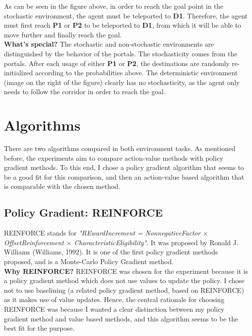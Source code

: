 \documentclass[10pt, letterpaper, twocolumn]{article}
\begin{document}
	As can be seen in the figure above, in order to reach the goal point in the stochastic environment, the agent must be teleported to \textbf{D1}. Therefore, the agent must first reach \textbf{P1} or \textbf{P2} to be teleported to \textbf{D1}, from which it will be able to move further and finally reach the goal.\\
	
	\noindent \textbf{What's special?} The stochastic and non-stochastic environments are distinguished by the behavior of the portals. The stochasticity comes from the portals. After each usage of either \textbf{P1} or \textbf{P2}, the destinations are randomly re-initialized according to the probabilities above. The deterministic environment (image on the right of the figure) clearly has no stochasticity, as the agent only needs to follow the corridor in order to reach the goal.
	
	\section{Algorithms}
	
	\noindent There are two algorithms compared in both environment tasks. As mentioned before, the experiments aim to compare action-value methods with policy gradient methods. To this end, I chose a policy gradient algorithm that seems to be a good fit for this comparison, and then an action-value based algorithm that is comparable with the chosen method.
	
	\subsection{Policy Gradient: REINFORCE}
	\noindent REINFORCE stands for \textit{"REwardIncrement = NonnegativeFactor $\times$ OffsetReinforcement $\times$ CharacteristicEligibility"}. It was proposed by Ronald J. Williams (Williams, 1992). It is one of the first policy gradient methods proposed, and is a Monte-Carlo Policy Gradient method. \\
	
	\noindent \textbf{Why REINFORCE?} REINFORCE was chosen for the experiment because it is a policy gradient method which does not use values to update the policy. I chose not to use baselining (a related policy gradient method, based on REINFORCE) as it makes use of value updates. Hence, the central rationale for choosing REINFORCE was because I wanted a clear distinction between my policy gradient method and value based methods, and this algorithm seems to be the best fit for the purpose.
	
\end{document}
